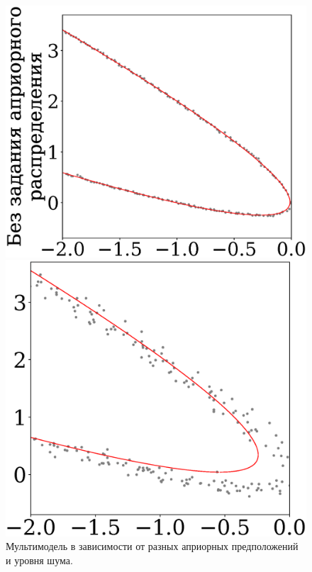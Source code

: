 \documentclass[12pt,twoside]{article}
\begin{document}
\begin{figure}
\begin{minipage}{.49\textwidth}
\end{minipage} 
\smallskip
\begin{minipage}{.49\textwidth}
 \centering
      \includegraphics[scale = 0.4]{500.eps} 
\end{minipage}
\begin{minipage}{.49\textwidth}
  \centering
  \vspace{2mm}
  \hspace{4mm}
  \includegraphics[scale = 0.4]{501.eps}
\end{minipage} 
\caption{Мультимодель в зависимости от разных априорных предположений и уровня шума.}
\end{figure}
\end{document}
